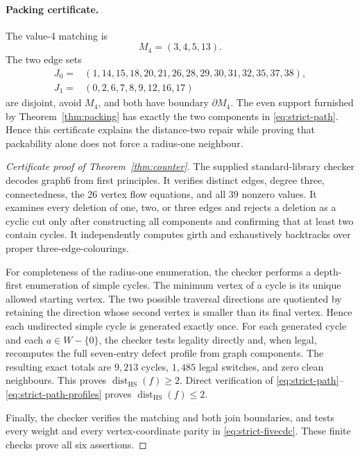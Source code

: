 \documentclass[11pt]{article}
\theoremstyle{definition}
\theoremstyle{remark}
\newcommand{\dist}{\operatorname{dist}}
\newcommand{\HS}{\mathrm{HS}}
\numberwithin{equation}{section}
\begin{document}
\paragraph{Packing certificate.}
The value-4 matching is
\[
                         M_4=(3,4,5,13).
\]
The two edge sets
\begin{align*}
J_0={}&(1,14,15,18,20,21,26,28,29,30,31,32,35,37,38),\\
J_1={}&(0,2,6,7,8,9,12,16,17)
\end{align*}
are disjoint, avoid \(M_4\), and both have boundary
\(\partial M_4\).  The even support furnished by
Theorem~\ref{thm:packing} has exactly the two components in
\eqref{eq:strict-path}.
Hence this certificate explains the distance-two repair while proving
that packability alone does not force a radius-one neighbour.

\begin{proof}[Certificate proof of Theorem~\ref{thm:counter}]
The supplied standard-library checker decodes graph6 from first
principles.  It verifies distinct edges, degree three, connectedness,
the 26 vertex flow equations, and all 39 nonzero values.  It examines every deletion
of one, two, or three edges and rejects a deletion as a cyclic cut only
after constructing all components and confirming that at least two
contain cycles.  It independently computes girth and exhaustively
backtracks over proper three-edge-colourings.

For completeness of the radius-one enumeration, the checker performs a
depth-first enumeration of simple cycles.  The minimum vertex of a cycle
is its unique allowed starting vertex.  The two possible traversal
directions are quotiented by retaining the direction whose second vertex
is smaller than its final vertex.  Hence each undirected simple cycle is
generated exactly once.  For each generated cycle and each
\(a\in W-\{0\}\), the checker tests legality directly and, when legal,
recomputes the full seven-entry defect profile from graph components.
The resulting exact totals are \(9{,}213\) cycles, \(1{,}485\) legal
switches, and zero clean neighbours.  This proves
\(\dist_{\HS}(f)\geq2\).  Direct verification of
\eqref{eq:strict-path}--\eqref{eq:strict-path-profiles} proves
\(\dist_{\HS}(f)\leq2\).

Finally, the checker verifies the matching and both join boundaries,
and tests every weight and every vertex-coordinate parity in
\eqref{eq:strict-fivecdc}.
These finite checks prove all six assertions.
\end{proof}
\end{document}
